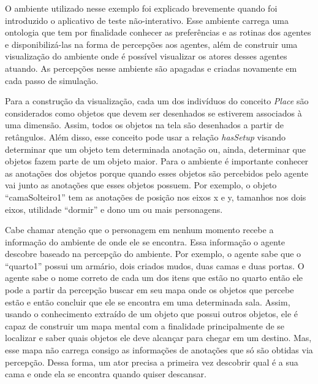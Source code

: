 O ambiente utilizado nesse exemplo foi explicado brevemente quando foi introduzido o
aplicativo de teste não-interativo. Esse ambiente carrega uma ontologia que
tem por finalidade conhecer as preferências e as rotinas dos agentes e
disponibilizá-las na forma de percepções aos agentes, além de
construir uma visualização do ambiente onde é possível visualizar os atores
desses agentes atuando. As percepções nesse ambiente são apagadas e criadas
novamente em cada passo de simulação.

Para a construção da visualização, cada um dos indivíduos do conceito
\emph{Place} são considerados como objetos que devem ser desenhados se
estiverem associados à uma dimensão. Assim, todos os objetos na tela são
desenhados a partir de retângulos. Além disso, esse conceito pode usar a
relação \emph{hasSetup} visando determinar que um objeto tem determinada
anotação ou, ainda, determinar que objetos fazem parte de um objeto maior.
Para o ambiente é importante conhecer as anotações dos objetos porque
quando esses objetos são percebidos pelo agente vai junto as anotações
que esses objetos possuem. Por exemplo, o objeto ``camaSolteiro1'' tem as
anotações de posição nos eixos x e y, tamanhos nos dois eixos, utilidade
``dormir'' e dono um ou mais personagens.

Cabe chamar atenção que o personagem em nenhum momento recebe a informação
do ambiente de onde ele se encontra. Essa informação o agente descobre baseado
na percepção do ambiente. Por exemplo, o agente sabe que o ``quarto1'' possui
um armário, dois criados mudos, duas camas e duas portas. O agente sabe o nome
correto de cada um dos itens que estão no quarto então ele pode a partir da
percepção buscar em seu mapa onde os objetos que percebe estão e então
concluir que ele se encontra em uma determinada sala. Assim, usando o
conhecimento extraído de um objeto que possui outros objetos, ele é capaz de
construir um mapa mental com a finalidade principalmente de se localizar e
saber quais objetos ele deve alcançar para chegar em um destino. Mas, esse
mapa não carrega consigo as informações de anotações que só são obtidas via
percepção. Dessa forma, um ator precisa a primeira vez descobrir qual é a sua
cama e onde ela se encontra quando quiser descansar.

